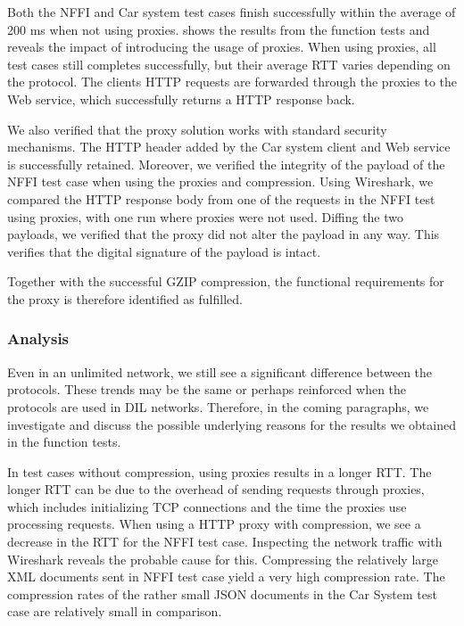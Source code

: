 Both the NFFI and Car system test cases finish successfully within the average
of 200 ms when not using proxies.  shows
the results from the function tests and reveals the impact of introducing the
usage of proxies. When using proxies, all test cases still completes
successfully, but their average RTT varies depending on the protocol. The
clients HTTP requests are forwarded through the proxies to the Web service,
which successfully returns a HTTP response back.

We also verified that the proxy solution works with standard security
mechanisms. The HTTP header added by the Car system client and Web service is
successfully retained. Moreover, we verified the integrity of the payload of the
NFFI test case when using the proxies and compression. Using Wireshark, we
compared the HTTP response body from one of the requests in the NFFI test using
proxies, with one run where proxies were not used. Diffing the two payloads, we
verified that the proxy did not alter the payload in any way. This verifies that
the digital signature of the payload is intact.

Together with the successful GZIP compression, the functional requirements for
the proxy is therefore identified as fulfilled.

\subsubsection{Analysis}

Even in an unlimited network, we still see a significant difference between the
protocols. These trends may be the same or perhaps reinforced when the protocols
are used in DIL networks. Therefore, in the coming paragraphs, we investigate
and discuss the possible underlying reasons for the results we obtained in the
function tests.

In test cases without compression, using proxies results in a longer RTT. The
longer RTT can be due to the overhead of sending requests through proxies, which
includes initializing TCP connections and the time the proxies use processing
requests. When using a HTTP proxy with compression, we see a decrease in the RTT
for the NFFI test case. Inspecting the network traffic with Wireshark reveals
the probable cause for this. Compressing the relatively large XML documents sent
in NFFI test case yield a very high compression rate. The compression rates of
the rather small JSON documents in the Car System test case are relatively small
in comparison.

